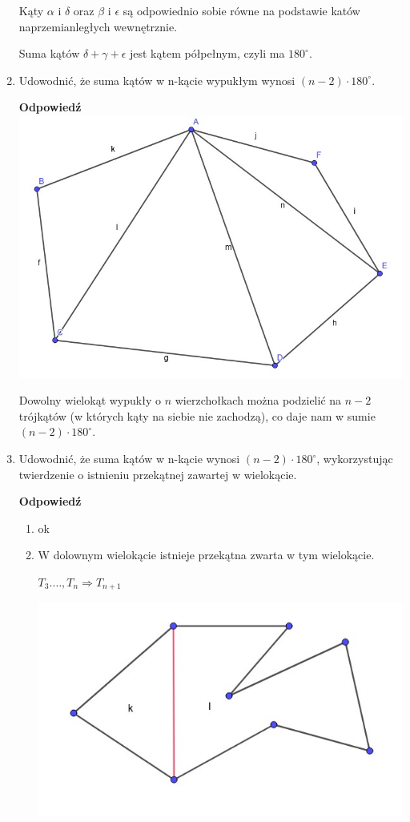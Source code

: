 \documentclass[12pt,a4paper]{article}
\newcounter{twierdzenie}
\theoremstyle{break}
\newcommand{\Odp}[1]{
		\begin{mdframed}[style=zadanie]
			\textbf{Odpowiedź}\\
			#1
		\end{mdframed}
	}
\begin{document}
\begin{enumerate}[1.]
{		Kąty $\alpha$ i $\delta$ oraz $\beta$ i $\epsilon$ są odpowiednio sobie równe na podstawie katów naprzemianległych wewnętrznie.
		
		Suma kątów $\delta + \gamma + \epsilon$ jest kątem półpełnym, czyli ma $180^\circ$.
	}
	
	\item Udowodnić, że suma kątów w n-kącie wypukłym wynosi $(n - 2) \cdot 180^\circ$.
	\Odp{
		\includegraphics[width=\linewidth]{wielo180.jpeg}
		
		Dowolny wielokąt wypukły o $n$ wierzchołkach można podzielić na $n-2$ trójkątów (w których kąty na siebie nie zachodzą), co daje nam w sumie $(n-2)\cdot 180^\circ$.
	}
	
	\item Udowodnić, że suma kątów w n-kącie wynosi $(n - 2) \cdot 180^\circ$, wykorzystując twierdzenie o istnieniu przekątnej zawartej w wielokącie.
	\Odp{
		\begin{enumerate}[I]
			\item ok
			\item W dolownym wielokącie istnieje przekątna zwarta w tym wielokącie.
			
			$T_3.\dots,T_n\Rightarrow T_{n+1}$
			
			\includegraphics[width=\linewidth]{1ind180.jpeg}
			

\end{enumerate}}
\end{enumerate}
\end{document}
